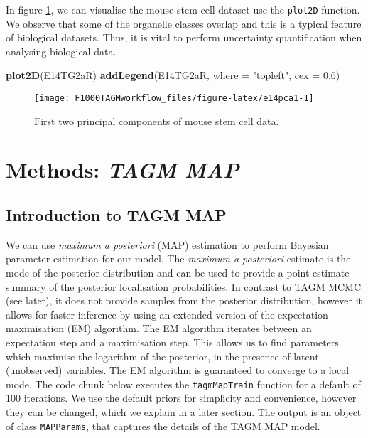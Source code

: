 \documentclass[9pt,a4paper,]{extarticle}
\newenvironment{Shaded}{\begin{snugshade}}{\end{snugshade}}
\newcommand{\DataTypeTok}[1]{\textcolor[rgb]{0.13,0.29,0.53}{#1}}
\newcommand{\FloatTok}[1]{\textcolor[rgb]{0.00,0.00,0.81}{#1}}
\newcommand{\KeywordTok}[1]{\textcolor[rgb]{0.13,0.29,0.53}{\textbf{#1}}}
\newcommand{\NormalTok}[1]{#1}
\newcommand{\StringTok}[1]{\textcolor[rgb]{0.31,0.60,0.02}{#1}}
\begin{document}
In figure \ref{fig:e14pca1}, we can visualise the mouse stem
cell dataset use the \texttt{plot2D} function. We observe that some of the
organelle classes overlap and this is a typical feature of biological
datasets. Thus, it is vital to perform uncertainty quantification when
analysing biological data.

\begin{Shaded}
\begin{Highlighting}[]
\KeywordTok{plot2D}\NormalTok{(E14TG2aR)}
\KeywordTok{addLegend}\NormalTok{(E14TG2aR, }\DataTypeTok{where =} \StringTok{"topleft"}\NormalTok{, }\DataTypeTok{cex =} \FloatTok{0.6}\NormalTok{)}
\end{Highlighting}
\end{Shaded}

\begin{figure}

{\centering \texttt{[image: F1000TAGMworkflow\_files/figure-latex/e14pca1-1]} 

}

\caption{First two principal components of mouse stem cell data.}\label{fig:e14pca1}
\end{figure}

\hypertarget{methods-tagm-map}{%
\section{\texorpdfstring{Methods: \emph{TAGM MAP}}{Methods: TAGM MAP}}\label{methods-tagm-map}}

\hypertarget{introduction-to-tagm-map}{%
\subsection{Introduction to TAGM MAP}\label{introduction-to-tagm-map}}

We can use \emph{maximum a posteriori} (MAP) estimation to perform
Bayesian parameter estimation for our model. The \emph{maximum a posteriori} estimate
is the mode of the posterior distribution and can be used to
provide a point estimate summary of the posterior localisation
probabilities. In contrast to TAGM MCMC (see later), it does not provide samples from the posterior
distribution, however it allows for faster inference by using an extended version of the
expectation-maximisation (EM) algorithm. The EM algorithm
iterates between an expectation step and a maximisation step. This
allows us to find parameters which maximise the logarithm of the
posterior, in the presence of latent (unobserved) variables. The EM
algorithm is guaranteed to converge to a local mode. The code chunk
below executes the \texttt{tagmMapTrain} function for a default of 100
iterations. We use the default priors for simplicity and convenience,
however they can be changed, which we explain in a later section. The
output is an object of class \texttt{MAPParams}, that captures the details of
the TAGM MAP model.
\end{document}
